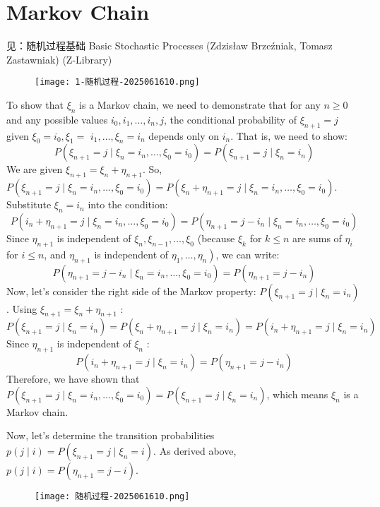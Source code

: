 \section{Markov Chain}

见：随机过程基础 Basic Stochastic Processes (Zdzisław Brzeźniak, Tomasz Zastawniak) (Z-Library)

\begin{figure}[H]
\centering
\texttt{[image: 1-随机过程-2025061610.png]}
\label{}
\end{figure}

To show that $\xi_n$ is a Markov chain, we need to demonstrate that for any $n \geq 0$ and any possible values $i_0, i_1, \ldots, i_n, j$, the conditional probability of $\xi_{n+1}=j$ given $\xi_0=i_0, \xi_1=$ $i_1, \ldots, \xi_n=i_n$ depends only on $i_n$. That is, we need to show:
\[
P\left(\xi_{n+1}=j \mid \xi_n=i_n, \ldots, \xi_0=i_0\right)=P\left(\xi_{n+1}=j \mid \xi_n=i_n\right)
\]
We are given $\xi_{n+1}=\xi_n+\eta_{n+1}$.
So, $P\left(\xi_{n+1}=j \mid \xi_n=i_n, \ldots, \xi_0=i_0\right)=P\left(\xi_n+\eta_{n+1}=j \mid \xi_n=i_n, \ldots, \xi_0=i_0\right)$.
Substitute $\xi_n=i_n$ into the condition:
\[
P\left(i_n+\eta_{n+1}=j \mid \xi_n=i_n, \ldots, \xi_0=i_0\right)=P\left(\eta_{n+1}=j-i_n \mid \xi_n=i_n, \ldots, \xi_0=i_0\right)
\]
Since $\eta_{n+1}$ is independent of $\xi_n, \xi_{n-1}, \ldots, \xi_0$ (because $\xi_k$ for $k \leq n$ are sums of $\eta_i$ for $i \leq n$, and $\eta_{n+1}$ is independent of $\left.\eta_1, \ldots, \eta_n\right)$, we can write:
\[
P\left(\eta_{n+1}=j-i_n \mid \xi_n=i_n, \ldots, \xi_0=i_0\right)=P\left(\eta_{n+1}=j-i_n\right)
\]
Now, let's consider the right side of the Markov property: $P\left(\xi_{n+1}=j \mid \xi_n=i_n\right)$.
Using $\xi_{n+1}=\xi_n+\eta_{n+1}$ :
\[
P\left(\xi_{n+1}=j \mid \xi_n=i_n\right)=P\left(\xi_n+\eta_{n+1}=j \mid \xi_n=i_n\right)=P\left(i_n+\eta_{n+1}=j \mid \xi_n=i_n\right)
\]
Since $\eta_{n+1}$ is independent of $\xi_n$ :
\[
P\left(i_n+\eta_{n+1}=j \mid \xi_n=i_n\right)=P\left(\eta_{n+1}=j-i_n\right)
\]
Therefore, we have shown that $P\left(\xi_{n+1}=j \mid \xi_n=i_n, \ldots, \xi_0=i_0\right)=P\left(\xi_{n+1}=j \mid \xi_n=i_n\right)$, which means $\xi_n$ is a Markov chain.

Now, let's determine the transition probabilities $p(j \mid i)=P\left(\xi_{n+1}=j \mid \xi_n=i\right)$.
As derived above, $p(j \mid i)=P\left(\eta_{n+1}=j-i\right)$.

\begin{figure}[H]
\centering
\texttt{[image: 随机过程-2025061610.png]}
\label{}
\end{figure}

